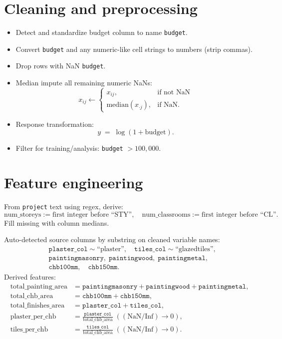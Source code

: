 \documentclass[11pt]{article}
\begin{document}
\section*{Cleaning and preprocessing}
\begin{itemize}
  \item Detect and standardize budget column to name \texttt{budget}.
  \item Convert \texttt{budget} and any numeric-like cell strings to numbers (strip commas).
  \item Drop rows with NaN \texttt{budget}.
  \item Median impute all remaining numeric NaNs:
  \[
    x_{ij} \leftarrow 
    \begin{cases}
      x_{ij}, & \text{if not NaN} \\
      \mathrm{median}(x_{\cdot j}), & \text{if NaN}.
    \end{cases}
  \]
  \item Response transformation:
  \[
    y \;=\; \log(1+\mathrm{budget}).
  \]
  \item Filter for training/analysis: \texttt{budget} $> 100{,}000$.
\end{itemize}

\section*{Feature engineering}
From \texttt{project} text using regex, derive:
\[
\text{num\_storeys} := \text{first integer before ``STY''},\quad
\text{num\_classrooms} := \text{first integer before ``CL''}.
\]
Fill missing with column medians.

Auto-detected source columns by substring on cleaned variable names:
\[
\begin{aligned}
&\texttt{plaster\_col} \sim \text{``plaster''},\quad
\texttt{tiles\_col} \sim \text{``glazedtiles''},\\
&\texttt{paintingmasonry},\; \texttt{paintingwood},\; \texttt{paintingmetal},\\
&\texttt{chb100mm},\quad \texttt{chb150mm}.
\end{aligned}
\]
Derived features:
\[
\begin{aligned}
\text{total\_painting\_area} &= \texttt{paintingmasonry} + \texttt{paintingwood} + \texttt{paintingmetal},\\
\text{total\_chb\_area} &= \texttt{chb100mm} + \texttt{chb150mm},\\
\text{total\_finishes\_area} &= \texttt{plaster\_col} + \texttt{tiles\_col},\\
\text{plaster\_per\_chb} &= \frac{\texttt{plaster\_col}}{\text{total\_chb\_area}}\;((\mathrm{NaN/Inf})\rightarrow 0),\\
\text{tiles\_per\_chb} &= \frac{\texttt{tiles\_col}}{\text{total\_chb\_area}}\;((\mathrm{NaN/Inf})\rightarrow 0).\\
\end{aligned}
\]
\end{document}
